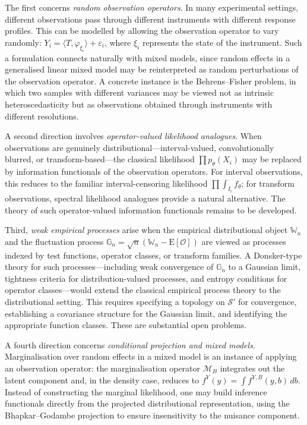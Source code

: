 \documentclass[11pt,a4paper]{article}
\newcommand{\E}{\mathrm{E}}
\begin{document}
The first concerns \emph{random observation operators}.  In many
experimental settings, different observations pass through different
instruments with different response profiles.  This can be modelled by
allowing the observation operator to vary randomly:
$Y_i = \langle T, \varphi_{\xi_i} \rangle + \varepsilon_i$, where $\xi_i$
represents the state of the instrument.  Such a formulation connects
naturally with mixed models, since random effects in a generalised linear
mixed model may be reinterpreted as random perturbations of the
observation operator.  A concrete instance is the Behrens--Fisher problem,
in which two samples with different variances may be viewed not as
intrinsic heteroscedasticity but as observations obtained through
instruments with different resolutions.

A second direction involves \emph{operator-valued likelihood analogues}.
When observations are genuinely distributional---interval-valued,
convolutionally blurred, or transform-based---the classical likelihood
$\prod p_\theta(X_i)$ may be replaced by information functionals of the
observation operators.  For interval observations, this reduces to the
familiar interval-censoring likelihood $\prod \int_{I_i} f_\theta$; for
transform observations, spectral likelihood analogues provide a natural
alternative.  The theory of such operator-valued information functionals
remains to be developed.

Third, \emph{weak empirical processes} arise when the empirical
distributional object $\mathbb W_n$ and the fluctuation process
$\mathbb G_n = \sqrt{n}(\mathbb W_n - \E[\mathcal O])$ are viewed as
processes indexed by test functions, operator classes, or transform
families.  A Donsker-type theory for such processes---including weak
convergence of $\mathbb G_n$ to a Gaussian limit, tightness criteria for
distribution-valued processes, and entropy conditions for operator
classes---would extend the classical empirical process theory to the
distributional setting.  This requires specifying a topology on
$\mathcal S'$ for convergence, establishing a covariance structure for
the Gaussian limit, and identifying the appropriate function classes.
These are substantial open problems.

A fourth direction concerns \emph{conditional projection and mixed
models}.  Marginalisation over random effects in a mixed model is an
instance of applying an observation operator: the marginalisation operator
$\mathcal M_B$ integrates out the latent component and, in the density
case, reduces to $f^Y(y) = \int f^{Y,B}(y,b)\,db$.  Instead of
constructing the marginal likelihood, one may build inference functionals
directly from the projected distributional representation, using the
Bhapkar--Godambe projection to ensure insensitivity to the nuisance
component.
\end{document}
